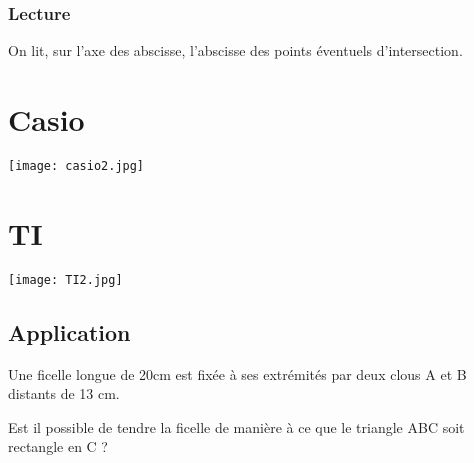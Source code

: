 \subsubsection*{Lecture}
On lit, sur l'axe des abscisse, l'abscisse des points éventuels d'intersection.
\vspace{0.5cm}

\begin{minipage}{7.5cm}
\section*{Casio}
\texttt{[image: casio2.jpg]}
\end{minipage} \hspace{1cm}
\begin{minipage}{7.5cm}
\section*{TI}
\texttt{[image: TI2.jpg]}
\end{minipage}

\vspace{0.5cm}
\begin{center}
\end{center}


\subsection*{Application}

Une ficelle longue de 20cm est fixée à ses extrémités par deux clous A et B distants de 13 cm.

Est il possible de tendre la ficelle de manière à ce que le triangle ABC soit rectangle en C ?
